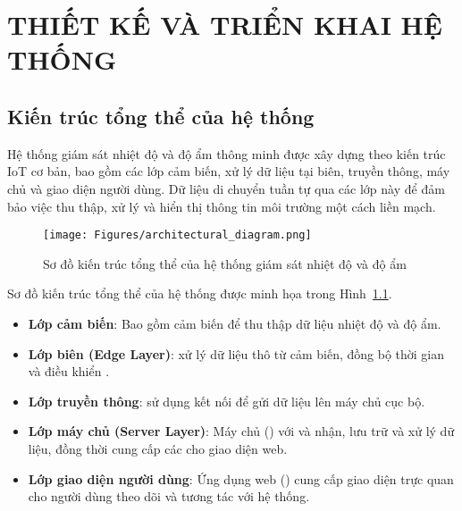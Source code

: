 
\chapter{THIẾT KẾ VÀ TRIỂN KHAI HỆ THỐNG} %

\label{Chapter2} %


\section{Kiến trúc tổng thể của hệ thống}
Hệ thống giám sát nhiệt độ và độ ẩm thông minh được xây dựng theo kiến trúc IoT cơ bản, bao gồm các lớp cảm biến, xử lý dữ liệu tại biên, truyền thông, máy chủ và giao diện người dùng. Dữ liệu di chuyển tuần tự qua các lớp này để đảm bảo việc thu thập, xử lý và hiển thị thông tin môi trường một cách liền mạch.

\begin{figure}[hbtp]
	\centering
	\texttt{[image: Figures/architectural\_diagram.png]} %
	\caption{Sơ đồ kiến trúc tổng thể của hệ thống giám sát nhiệt độ và độ ẩm}
	\label{fig:architecture}
\end{figure}

Sơ đồ kiến trúc tổng thể của hệ thống được minh họa trong Hình~\ref{fig:architecture}.
\begin{itemize}
	\item \textbf{Lớp cảm biến}: Bao gồm cảm biến  để thu thập dữ liệu nhiệt độ và độ ẩm.
	\item \textbf{Lớp biên (Edge Layer)}:  xử lý dữ liệu thô từ cảm biến, đồng bộ thời gian và điều khiển .
	\item \textbf{Lớp truyền thông}:  sử dụng kết nối  để gửi dữ liệu lên máy chủ cục bộ.
	\item \textbf{Lớp máy chủ (Server Layer)}: Máy chủ  () với  và  nhận, lưu trữ và xử lý dữ liệu, đồng thời cung cấp các  cho giao diện web.
	\item \textbf{Lớp giao diện người dùng}: Ứng dụng web () cung cấp giao diện trực quan cho người dùng theo dõi và tương tác với hệ thống.
\end{itemize}

